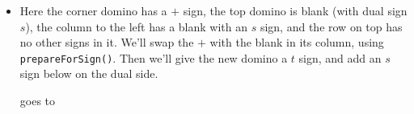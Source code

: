 \documentclass[12pt]{article}
\numberwithin{equation}{section}
\newcommand{\horizontalDominoRSShift}[4]{\filldraw [dominoRSStyle] (#2 - 1 + #4 + \eps, #1 - 1 + \eps) rectangle + (2 - \teps, 1 -\teps) node [dominoText] {$#3$};}
\newcommand{\verticalDominoRSShift}[4]{\filldraw [dominoRSStyle] (#2 - 1 + #4 + \eps,  #1 - 1 + \eps) rectangle + (1 - \teps,2 -\teps) node [dominoText] {$#3$};}
\begin{document}
\begin{itemize}
\begin{itemize}
      \item Here the corner domino has a $+$ sign, the top domino is blank (with dual sign $s$), the column to the left has a blank with an $s$ sign, and the row on top has no other signs in it.
      We'll swap the $+$ with the blank in its column, using \texttt{prepareForSign()}.
      Then we'll give the new domino a $t$ sign, and add an $s$ sign below on the dual side.
      \begin{figure}[H]
        \centering
      \end{figure}
      goes to
      \begin{figure}[H]
        \centering
      \end{figure}

\end{itemize}
\end{itemize}
\end{document}
